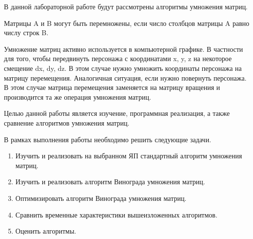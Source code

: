 \Introduction

В данной лабораторной работе будут рассмотрены алгоритмы умножения матриц.

Матрицы A и B могут быть перемножены, если число столбцов матрицы A равно числу строк B. 

Умножение матриц активно используется в компьютерной графике.
В частности для того, чтобы передвинуть персонажа с координатами x, y, z
на некоторое смещение dx, dy, dz. В этом случае нужно умножить 
координаты персонажа на матрицу перемещения. 
Аналогичная ситуация, если нужно повернуть персонажа. 
В этом случае матрица перемещения заменяется на матрицу вращения
и производится та же операция умножения матриц.  

Целью данной работы является изучение, программная реализация, а также 
сравнение алгоритмов умножения матриц.

В рамках выполнения работы необходимо решить следующие задачи.

\begin{enumerate}
	\item Изучить и реализовать на выбранном ЯП стандартный алгоритм умножения матриц.
	\item Изучить и реализовать алгоритм Винограда умножения матриц.
	\item Оптимизировать алгоритм Винограда умножения матриц.
	\item Сравнить временные характеристики вышеизложенных алгоритмов.
	\item Оценить алгоритмы.
\end{enumerate}
